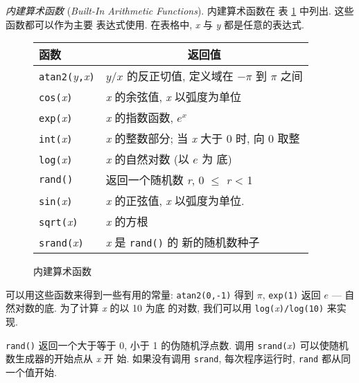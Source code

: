 \emph{内建算术函数} (\emph{Built-In Arithmetic Functions}). 内建算术函数在
表 \ref{tbl:built_in_arithmetic_functions} 中列出. 这些函数都可以作为主要
表达式使用. 在表格中, \textit{x} 与 \textit{y} 都是任意的表达式.

\begin{figure}[ht]
\captionsetup{type=table}
\caption{内建算术函数}
\label{tbl:built_in_arithmetic_functions}
\begin{center}
    \begin{tabular}{l|l}
        \hline
        \hline
        函数    & \multicolumn{1}{c}{返回值}    \\
        \hline
        \verb'atan2('\textit{y}\verb','\textit{x}\verb')'   & $y/x$ 的反正切值,
        定义域在 $-\pi$ 到 $\pi$ 之间   \\
        \verb'cos('\textit{x}\verb')'   & \textit{x} 的余弦值, \textit{x}
        以弧度为单位    \\
        \verb'exp('\textit{x}\verb')'   & \textit{x} 的指数函数, $e^x$ \\
        \verb'int('\textit{x}\verb')'   & \textit{x} 的整数部分; 当
        \textit{x} 大于 0 时, 向 0 取整 \\
        \verb'log('\textit{x}\verb')'   & \textit{x} 的自然对数 (以 $e$ 为
        底)  \\
        \verb'rand()'   & 返回一个随机数 \textit{r}, 0 $\le$ \textit{r}
        < 1 \\
        \verb'sin('\textit{x}\verb')'   & \textit{x} 的正弦值, \textit{x}
        以弧度为单位.   \\
        \verb'sqrt('\textit{x}\verb')'  & \textit{x} 的方根 \\
        \verb'srand('\textit{x}\verb')' & \textit{x} 是 \verb'rand()' 的
        新的随机数种子  \\
        \hline
    \end{tabular}
\end{center}
\end{figure}

可以用这些函数来得到一些有用的常量: \verb'atan2(0,-1)' 得到 $\pi$,
\verb'exp(1)' 返回 $e$ --- 自然对数的底. 为了计算 \textit{x} 的以 10 为底
的对数, 我们可以用 \verb'log('\textit{x}\verb')/log(10)' 来实现.

\verb'rand()' 返回一个大于等于 0, 小于 1 的伪随机浮点数. 调用
\verb'srand('\textit{x}\verb')' 可以使随机数生成器的开始点从 \textit{x} 开
始. 如果没有调用 \verb'srand', 每次程序运行时, \verb'rand'
都从同一个值开始.

